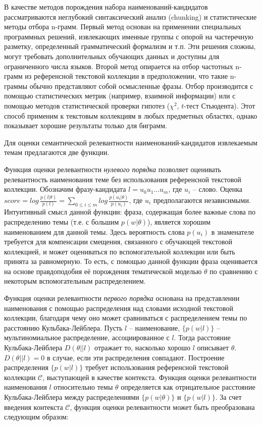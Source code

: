 В качестве методов порождения набора наименований-кандидатов рассматриваются неглубокий синтаксический анализ (chunking) и статистические методы отбора n-грамм. Первый метод основан на применении специальных программных решений, извлекающих именные группы с опорой на частеречную разметку, определенный грамматический формализм и т.п. Эти решения сложны, могут требовать дополнительных обучающих данных и доступны для ограниченного числа языков. Второй метод опирается на отбор частотных n-грамм из референсной текстовой коллекции в предположении, что такие n-граммы обычно представляют собой осмысленные фразы. Отбор производится с помощью статистических метрик  (например, взаимной информации) или с помощью методов статистической проверки гипотез ($\chi^2$, $t$-тест Стьюдента). Этот способ применим к текстовым коллекциям в любых предметных областях, однако показывает хорошие результаты только для биграмм.

Для оценки семантической релевантности наименований-кандидатов извлекаемым темам предлагаются две функции.

Функция оценки релевантности \textit{нулевого порядка} позволяет оценивать релевантность наименования теме без использования референсной текстовой коллекции. Обозначим фразу-кандидата $l = u_0 u_1 \ldots u_m$, где $u_i$ -- слово. Оценка $score = log \, \frac{p(l|\theta)}{p(l)} = \sum_{0 \leqslant i \leqslant m} log \, \frac{p(u_i|\theta)}{p(u_i)}$, где $u_i$ предполагаются независимыми. Интуитивный смысл данной функции: фраза, содержащая более важные слова по распределению темы (т.е. с большим $p(w|\theta)$), является хорошим наименованием для данной темы. Здесь вероятность слова $p(u_i)$ в знаменателе требуется для компенсации смещения, связанного с обучающей текстовой коллекцией, и может оцениваться по вспомогательной коллекции или быть принята за равномерную. То есть, с помощью данной функции фраза оценивается на основе правдоподобия её порождения тематической моделью $\theta$ по сравнению с некоторым вспомогательным распределением.

Функция оценки релевантности \textit{первого порядка} основана на представлении наименования с помощью распределения над словами исходной текстовой коллекции, благодаря чему оно может сравниваться с распределением темы по расстоянию Кульбака-Лейблера. Пусть $l$ -- наименование, $\{p(w|l)\}$ -- мультиномиальное распределение, ассоциированное с $l$. Тогда расстояние Кульбака-Лейблера $D(\theta||l)$ отражает то, насколько хорошо $l$ описывает $\theta$.  $D(\theta||l) = 0$ в случае, если эти распределения совпадают. Построение распределения $\{p(w|l)\}$ требует использования референсной текстовой коллекции $\mathcal{C}$, выступающей в качестве контекста. Функция оценки релевантности наименования $l$ относительно темы $\theta$ определяется как отрицательное расстояние Кульбака-Лейблера между распределениями $\{p(w|\theta)\}$ и $\{p(w|l)\}$. За счет введения контекста $\mathcal{C}$, функция оценки релевантности может быть преобразована следующим образом:

